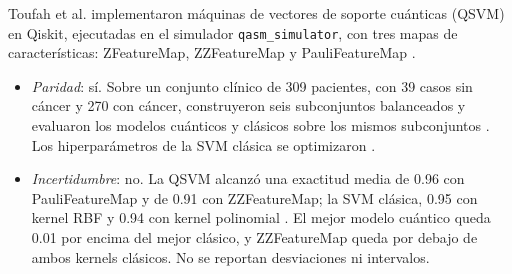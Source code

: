 Toufah et al. implementaron máquinas de vectores de soporte cuánticas (QSVM) en Qiskit, ejecutadas en el simulador \texttt{qasm\_simulator}, con tres mapas de características: ZFeatureMap, ZZFeatureMap y PauliFeatureMap \cite{ElHafidi2025}.
\begin{itemize}
  \item \textit{Paridad}: sí.
  Sobre un conjunto clínico de 309 pacientes, con 39 casos sin cáncer y 270 con cáncer, construyeron seis subconjuntos balanceados y evaluaron los modelos cuánticos y clásicos sobre los mismos subconjuntos \cite{ElHafidi2025}.
  Los hiperparámetros de la SVM clásica se optimizaron \cite{ElHafidi2025}.
  \item \textit{Incertidumbre}: no.
  La QSVM alcanzó una exactitud media de 0.96 con PauliFeatureMap y de 0.91 con ZZFeatureMap; la SVM clásica, 0.95 con kernel RBF y 0.94 con kernel polinomial \cite{ElHafidi2025}. El mejor modelo cuántico queda 0.01 por encima del mejor clásico, y ZZFeatureMap queda por debajo de ambos kernels clásicos. No se reportan desviaciones ni intervalos.

\end{itemize}
